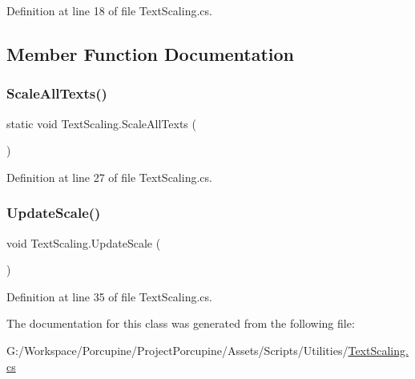 Definition at line 18 of file Text\+Scaling.\+cs.



\subsection{Member Function Documentation}
\mbox{\label{class_text_scaling_a54525f353fc9822caafafaa1b69e022a}} 
\subsubsection{\texorpdfstring{Scale\+All\+Texts()}{ScaleAllTexts()}}
{\footnotesize\ttfamily static void Text\+Scaling.\+Scale\+All\+Texts (\begin{DoxyParamCaption}{ }\end{DoxyParamCaption})\hspace{0.3cm}{\ttfamily [static]}}



Definition at line 27 of file Text\+Scaling.\+cs.

\mbox{\label{class_text_scaling_a4865e3782dc23d6759fc77fe4190e852}} 
\subsubsection{\texorpdfstring{Update\+Scale()}{UpdateScale()}}
{\footnotesize\ttfamily void Text\+Scaling.\+Update\+Scale (\begin{DoxyParamCaption}{ }\end{DoxyParamCaption})}



Definition at line 35 of file Text\+Scaling.\+cs.



The documentation for this class was generated from the following file\+:\begin{DoxyCompactItemize}
\item 
G\+:/\+Workspace/\+Porcupine/\+Project\+Porcupine/\+Assets/\+Scripts/\+Utilities/\hyperlink{_text_scaling_8cs}{Text\+Scaling.\+cs}\end{DoxyCompactItemize}
